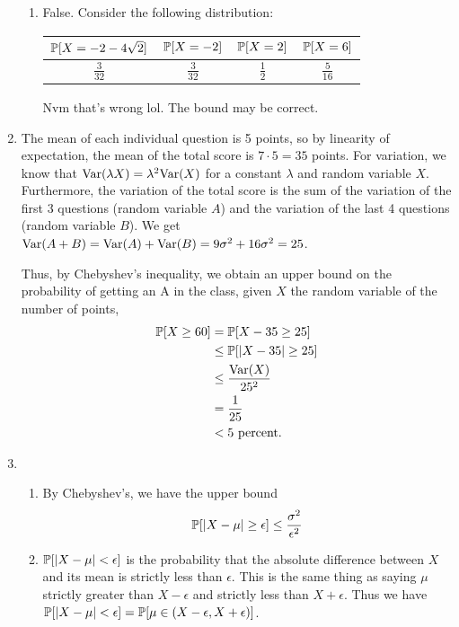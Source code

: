 \begin{enumerate}
\begin{enumerate}
        \item False. Consider the following distribution:
        
        \begin{tabular}{c|c|c|c}
          $\P[X = -2 - 4\sqrt{2}]$ & $\P[X = -2]$ & $\P[X = 2]$ & $\P[X = 6]$ \\
          \hline
          $\frac{3}{32}$ & $\frac{3}{32}$ & $\frac{1}{2}$ & $\frac{5}{16}$
        \end{tabular}
        
        Nvm that's wrong lol. The bound may be correct.
        
        
    \end{enumerate}
    
    \item The mean of each individual question is 5 points, so by linearity of expectation, the mean of the total score is $7 \cdot 5 = 35$ points. For variation, we know that $\f{Var}(\lambda X) = \lambda^2\f{Var}(X)$ for a constant $\lambda$ and random variable $X$. Furthermore, the variation of the total score is the sum of the variation of the first 3 questions (random variable $A$) and the variation of the last 4 questions (random variable $B$). We get $\f{Var}(A + B) = \f{Var}(A) + \f{Var}(B) = 9\sigma^2 + 16\sigma^2 = 25$. 
    
    Thus, by Chebyshev's inequality, we obtain an upper bound on the probability of getting an A in the class, given $X$ the random variable of the number of points,
    \begin{align*}
    \P[X \geq 60] &= \P[X - 35 \geq 25] \\
        &\leq \P[|X - 35| \geq 25] \\
        &\leq \frac{\f{Var}(X)}{25^2} \\
        &= \frac{1}{25} \\
        &< 5 \text{ percent}.
    \end{align*}
    
    \item \begin{enumerate}
        \item By Chebyshev's, we have the upper bound
        \[
        \P[|X - \mu| \geq \epsilon] \leq \frac{\sigma^2}{\epsilon^2}
        \]
        
        \item $\P[|X - \mu| < \epsilon]$ is the probability that the absolute difference between $X$ and its mean is strictly less than $\epsilon$. This is the same thing as saying $\mu$ strictly greater than $X - \epsilon$ and strictly less than $X + \epsilon$. Thus we have $\P[|X - \mu| < \epsilon] = \P[\mu \in (X - \epsilon, X + \epsilon)]$.
        

\end{enumerate}
\end{enumerate}
